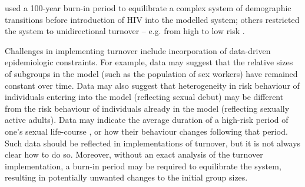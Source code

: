 \citet{Boily2015} used a 100-year burn-in period
to equilibrate a complex system of demographic transitions before 
introduction of HIV into the modelled system;
others restricted the system to unidirectional turnover -- e.g. from high to low risk
\citep{Eaton2014}.
\par
Challenges in implementing turnover include
incorporation of data-driven epidemiologic constraints.
For example, data may suggest
that the relative sizes of subgroups in the model
(such as the population of sex workers)
have remained constant over time. %
Data may also suggest that heterogeneity in risk behaviour
of individuals entering into the model (reflecting sexual debut)
may be different from the risk behaviour
of individuals already in the model (reflecting sexually active adults). %
Data may indicate the average duration
of a high-risk period of one's sexual life-course \citep{Watts2010}, %
or how their behaviour changes following that period. %
Such data should be reflected in implementations of turnover,
but it is not always clear how to do so.
Moreover, without an exact analysis of the turnover implementation,
a burn-in period may be required to equilibrate the system,
resulting in potentially unwanted changes to the initial group sizes.
